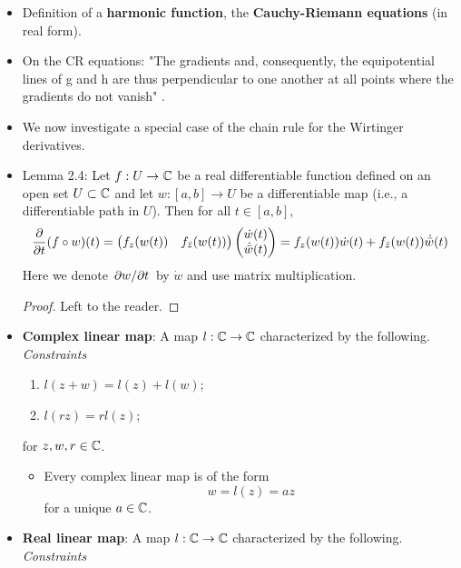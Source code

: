 \documentclass[../notes.tex]{subfiles}
\begin{document}
\begin{itemize}
    \item Definition of a \textbf{harmonic function}, the \textbf{Cauchy-Riemann equations} (in real form).
    \item On the CR equations: "The gradients and, consequently, the equipotential lines of g and h are thus perpendicular to one another at all points where the gradients do not vanish" \parencite[10]{bib:FischerLieb}.
    \item We now investigate a special case of the chain rule for the Wirtinger derivatives.
    \item Lemma 2.4: Let $f:U\to\mathbb{C}$ be a real differentiable function defined on an open set $U\subset\mathbb{C}$ and let $w:[a,b]\to U$ be a differentiable map (i.e., a differentiable path in $U$). Then for all $t\in[a,b]$,
    \begin{equation*}
        \pdv{t}(f\circ w)(t) =
        \begin{pmatrix}
            f_z(w(t)) & f_{\bar{z}}(w(t))\\
        \end{pmatrix}
        \begin{pmatrix}
            \dot{w}(t)\\
            \dot{\bar{w}}(t)\\
        \end{pmatrix}
        = f_z(w(t))\dot{w}(t)+f_{\bar{z}}(w(t))\dot{\bar{w}}(t)
    \end{equation*}
    Here we denote $\pdv*{w}{t}$ by $\dot{w}$ and use matrix multiplication.
    \begin{proof}
        Left to the reader.
    \end{proof}
    \item \textbf{Complex linear map}: A map $l:\mathbb{C}\to\mathbb{C}$ characterized by the following. \emph{Constraints}
    \begin{enumerate}
        \item $l(z+w)=l(z)+l(w)$;
        \item $l(rz)=rl(z)$;
    \end{enumerate}
    for $z,w,r\in\mathbb{C}$.
    \begin{itemize}
        \item Every complex linear map is of the form
        \begin{equation*}
            w = l(z) = az
        \end{equation*}
        for a unique $a\in\mathbb{C}$.
    \end{itemize}
    \item \textbf{Real linear map}: A map $l:\mathbb{C}\to\mathbb{C}$ characterized by the following. \emph{Constraints}

\end{itemize}
\end{document}
